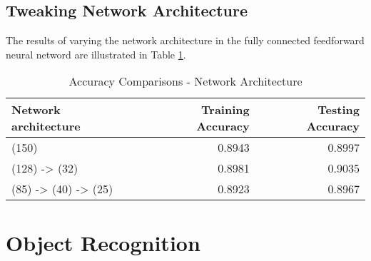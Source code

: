 \documentclass[parskip=half]{scrartcl}
\begin{document}

    \subsection{Tweaking Network Architecture} %
    \label{sub:tweaking_network_architecture}

        The results of varying the network architecture in the fully connected feedforward neural netword are illustrated in Table \ref{tab:accuracy_comparisons_network_architecture}.

        \begin{table}[th]
            \centering
            \begin{tabular}{| l | r | r |}
            \hline
            \textbf{Network architecture} & \textbf{Training Accuracy} & \textbf{Testing Accuracy} \\
            \hline
                \hline
                (150) & 0.8943 & 0.8997 \\
                \hline
                (128) -> (32) & 0.8981 & 0.9035 \\
                \hline
                (85) -> (40) -> (25) & 0.8923 & 0.8967 \\
            \hline
            \end{tabular}
            \caption{Accuracy Comparisons - Network Architecture}
            \label{tab:accuracy_comparisons_network_architecture}
        \end{table}
    
    



\section{Object Recognition} %
\label{sec:object_recognition}

\end{document}

